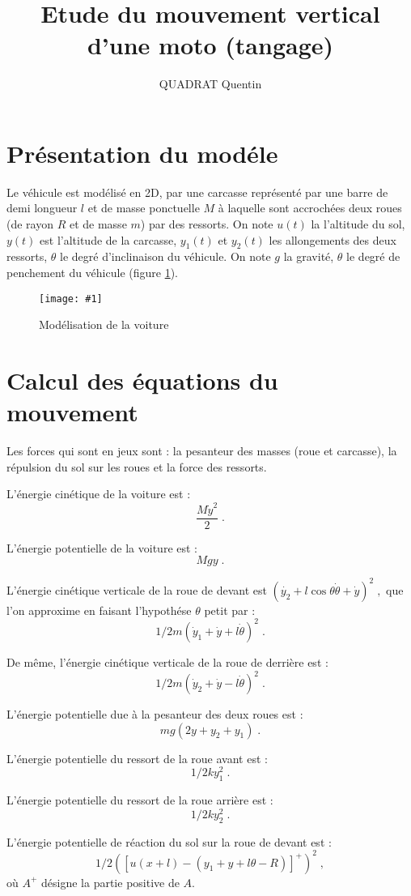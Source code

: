 \documentclass[a4paper,11pt]{amsart}
\title{Etude du mouvement vertical d'une moto (tangage)}
\author{QUADRAT Quentin}
\newcommand{\dessin}[4]{
\begin{figure}[htb]
\centering
\texttt{[image: \#1]}
\caption{#3}
\label{#4}
\end{figure}}
\begin{document}
\maketitle

\section{Pr\'esentation du mod\'ele}
Le v\'ehicule est mod\'elis\'e en 2D, par une carcasse repr\'esent\'e
par une barre de demi longueur $l$ et de masse ponctuelle $M$ \`a
laquelle sont accroch\'ees deux roues (de rayon $R$ et de masse $m$)
par des ressorts. On note $u(t)$ la l'altitude du sol, $y(t)$ est
l'altitude de la carcasse, $y_1(t)$ et $y_2(t)$ les allongements des
deux ressorts, $\theta$ le degr\'e d'inclinaison du v\'ehicule.  On
note $g$ la gravit\'e, $\theta$ le degr\'e de penchement du v\'ehicule
(figure \ref{dyna}).

\dessin{dyna.epsf}{0.5}{Mod\'elisation de la voiture}{dyna}

\section{Calcul des \'equations du mouvement}
Les forces qui sont en jeux sont : la pesanteur des masses (roue et
carcasse), la r\'epulsion du sol sur les roues et la force des ressorts.

L'\'energie cin\'etique de la voiture est : $$\frac{M\dot{y}^2}{2}\;.$$

L'\'energie potentielle de la voiture  est : $$Mgy\;.$$

L'\'energie cin\'etique verticale de la roue de devant est
$(\dot{y_2}+l\cos\theta\dot{\theta}+\dot{y})^2\;, $
que l'on approxime en faisant l'hypoth\'ese $\theta$ petit par :
$$1/2m(\dot{y}_1+\dot{y}+l\dot{\theta})^2\;.$$

De m\^eme, l'\'energie cin\'etique verticale de la roue de derri\`ere est :
$$1/2m(\dot{y}_2+\dot{y}-l\dot{\theta})^2\;.$$


L'\'energie potentielle due \`a la pesanteur des deux roues est :
$$mg(2y+y_2+y_1)\;.$$

L'\'energie potentielle du ressort de la roue avant est :
$$1/2ky_1^2\;.$$


L'\'energie potentielle du ressort de la roue arri\`ere est :
$$1/2ky_2^2\;.$$

L'\'energie potentielle de r\'eaction du sol sur la roue de devant est
:
$$1/2([u(x+l)-(y_1+y+l\theta-R)]^+)^2\;,$$
o\`u $A^+$ d\'esigne la partie positive de $A$.
\end{document}
